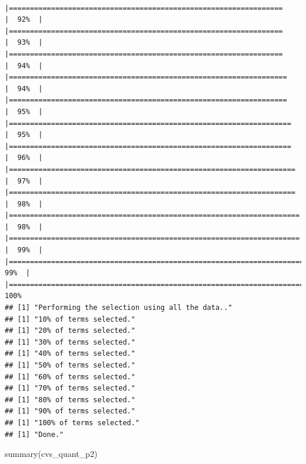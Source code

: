 \documentclass[
]{article}
\newenvironment{Shaded}{\begin{snugshade}}{\end{snugshade}}
\newcommand{\FunctionTok}[1]{\textcolor[rgb]{0.00,0.00,0.00}{#1}}
\newcommand{\NormalTok}[1]{#1}
\begin{document}
\begin{verbatim}
          |=================================================================     |  92%  |                                                                              |=================================================================     |  93%  |                                                                              |=================================================================     |  94%  |                                                                              |==================================================================    |  94%  |                                                                              |==================================================================    |  95%  |                                                                              |===================================================================   |  95%  |                                                                              |===================================================================   |  96%  |                                                                              |====================================================================  |  97%  |                                                                              |====================================================================  |  98%  |                                                                              |===================================================================== |  98%  |                                                                              |===================================================================== |  99%  |                                                                              |======================================================================|  99%  |                                                                              |======================================================================| 100%
## [1] "Performing the selection using all the data.."
## [1] "10% of terms selected."
## [1] "20% of terms selected."
## [1] "30% of terms selected."
## [1] "40% of terms selected."
## [1] "50% of terms selected."
## [1] "60% of terms selected."
## [1] "70% of terms selected."
## [1] "80% of terms selected."
## [1] "90% of terms selected."
## [1] "100% of terms selected."
## [1] "Done."
\end{verbatim}

\begin{Shaded}
\begin{Highlighting}[]
\FunctionTok{summary}\NormalTok{(cvs\_quant\_p2)}
\end{Highlighting}
\end{Shaded}
\end{document}
